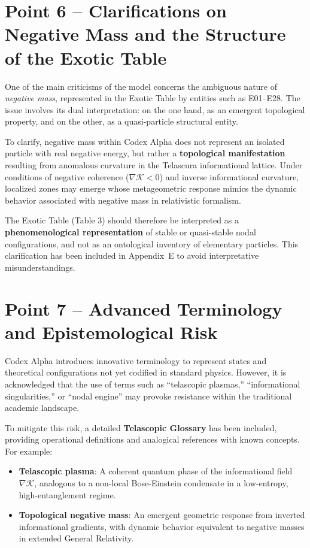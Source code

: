 \documentclass[12pt]{article}
\begin{document}
\section*{Point 6 – Clarifications on Negative Mass and the Structure of the Exotic Table}

One of the main criticisms of the model concerns the ambiguous nature of \textit{negative mass}, represented in the Exotic Table by entities such as E01–E28. The issue involves its dual interpretation: on the one hand, as an emergent topological property, and on the other, as a quasi-particle structural entity.

To clarify, negative mass within Codex Alpha does not represent an isolated particle with real negative energy, but rather a \textbf{topological manifestation} resulting from anomalous curvature in the Telascura informational lattice. Under conditions of negative coherence ($\nabla \mathcal{K} < 0$) and inverse informational curvature, localized zones may emerge whose metageometric response mimics the dynamic behavior associated with negative mass in relativistic formalism.

The Exotic Table (Table 3) should therefore be interpreted as a \textbf{phenomenological representation} of stable or quasi-stable nodal configurations, and not as an ontological inventory of elementary particles. This clarification has been included in Appendix~E to avoid interpretative misunderstandings.

\vspace{1em}
\section*{Point 7 – Advanced Terminology and Epistemological Risk}

Codex Alpha introduces innovative terminology to represent states and theoretical configurations not yet codified in standard physics. However, it is acknowledged that the use of terms such as “telascopic plasmas,” “informational singularities,” or “nodal engine” may provoke resistance within the traditional academic landscape.

To mitigate this risk, a detailed \textbf{Telascopic Glossary} has been included, providing operational definitions and analogical references with known concepts. For example:
\begin{itemize}
  \item \textbf{Telascopic plasma}: A coherent quantum phase of the informational field $\nabla \mathcal{K}$, analogous to a non-local Bose-Einstein condensate in a low-entropy, high-entanglement regime.
  \item \textbf{Topological negative mass}: An emergent geometric response from inverted informational gradients, with dynamic behavior equivalent to negative masses in extended General Relativity.
\end{itemize}
\end{document}
